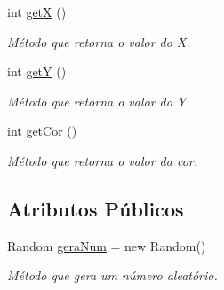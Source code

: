 \begin{DoxyCompactItemize}
\mbox{\label{class_veiculo_a235b29e1e25ec8c769b20fb2aeba8404}} 
int \mbox{\hyperlink{class_veiculo_a235b29e1e25ec8c769b20fb2aeba8404}{getX}} ()
\begin{DoxyCompactList}\small\item\em Método que retorna o valor do X. \end{DoxyCompactList}\item 
\mbox{\label{class_veiculo_a06b2a923e51186673a016f75d10363d3}} 
int \mbox{\hyperlink{class_veiculo_a06b2a923e51186673a016f75d10363d3}{getY}} ()
\begin{DoxyCompactList}\small\item\em Método que retorna o valor do Y. \end{DoxyCompactList}\item 
\mbox{\label{class_veiculo_a4fed5f48e6ddcf1c3e9a5a5ff9ba3067}} 
int \mbox{\hyperlink{class_veiculo_a4fed5f48e6ddcf1c3e9a5a5ff9ba3067}{get\+Cor}} ()
\begin{DoxyCompactList}\small\item\em Método que retorna o valor da cor. \end{DoxyCompactList}\end{DoxyCompactItemize}
\subsection*{Atributos Públicos}
\begin{DoxyCompactItemize}
\item 
\mbox{\label{class_veiculo_ae64c57511c4f7853a46313eced26bc21}} 
Random \mbox{\hyperlink{class_veiculo_ae64c57511c4f7853a46313eced26bc21}{gera\+Num}} = new Random()
\begin{DoxyCompactList}\small\item\em Método que gera um número aleatório. \end{DoxyCompactList}\end{DoxyCompactItemize}
